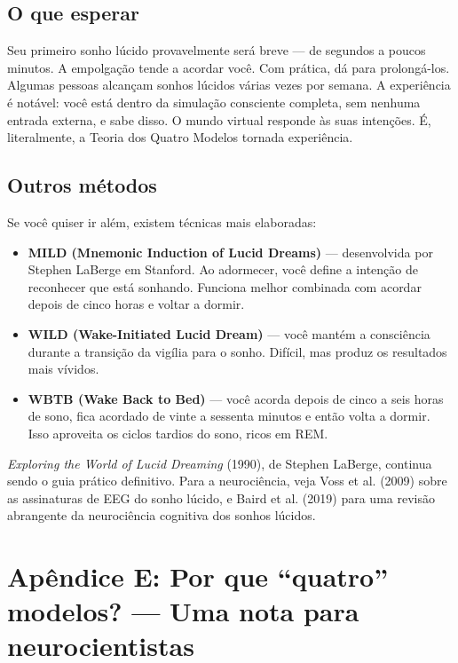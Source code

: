 \documentclass[11pt, twoside, openright]{book}
\begin{document}
\section*{O que esperar}

Seu primeiro sonho lúcido provavelmente será breve --- de segundos a poucos minutos. A empolgação tende a acordar você. Com prática, dá para prolongá-los. Algumas pessoas alcançam sonhos lúcidos várias vezes por semana. A experiência é notável: você está dentro da simulação consciente completa, sem nenhuma entrada externa, e sabe disso. O mundo virtual responde às suas intenções. É, literalmente, a Teoria dos Quatro Modelos tornada experiência.

\section*{Outros métodos}

Se você quiser ir além, existem técnicas mais elaboradas:

\begin{itemize}
  \item \textbf{MILD (Mnemonic Induction of Lucid Dreams)} --- desenvolvida por Stephen LaBerge em Stanford. Ao adormecer, você define a intenção de reconhecer que está sonhando. Funciona melhor combinada com acordar depois de cinco horas e voltar a dormir.
  \item \textbf{WILD (Wake-Initiated Lucid Dream)} --- você mantém a consciência durante a transição da vigília para o sonho. Difícil, mas produz os resultados mais vívidos.
  \item \textbf{WBTB (Wake Back to Bed)} --- você acorda depois de cinco a seis horas de sono, fica acordado de vinte a sessenta minutos e então volta a dormir. Isso aproveita os ciclos tardios do sono, ricos em REM.
\end{itemize}

\textit{Exploring the World of Lucid Dreaming} (1990), de Stephen LaBerge, continua sendo o guia prático definitivo. Para a neurociência, veja Voss et al. (2009) sobre as assinaturas de EEG do sonho lúcido, e Baird et al. (2019) para uma revisão abrangente da neurociência cognitiva dos sonhos lúcidos.


\chapter*{Apêndice E: Por que ``quatro'' modelos? --- Uma nota para neurocientistas}
\end{document}
